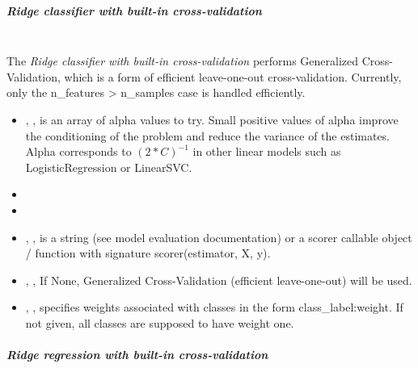 \subparagraph{Ridge classifier with built-in cross-validation}
\mbox{}
\\The \textit{Ridge classifier with built-in cross-validation} performs
Generalized Cross-Validation, which is a form of efficient leave-one-out
cross-validation.
%
Currently, only the n\_features > n\_samples case is handled efficiently.
%
\begin{itemize}
  \item {}, , is an
  array of alpha values to try.
  Small positive values of alpha improve the conditioning of the problem and
  reduce the variance of the estimates.
  Alpha corresponds to $(2*C)^{-1}$ in other linear models such as
  LogisticRegression or LinearSVC.
  \item {}
  \item {}
  \item {}, , is a
  string (see model evaluation documentation) or a scorer callable object /
  function with signature scorer(estimator, X, y).
  \item {}, ,
  If None, Generalized Cross-Validation (efficient leave-one-out) will be used.
  \item {}, , specifies
  weights associated with classes in the form {class\_label:weight}.
  If not given, all classes are supposed to have weight one.
\end{itemize}

\subparagraph{Ridge regression with built-in cross-validation}
\mbox{}

